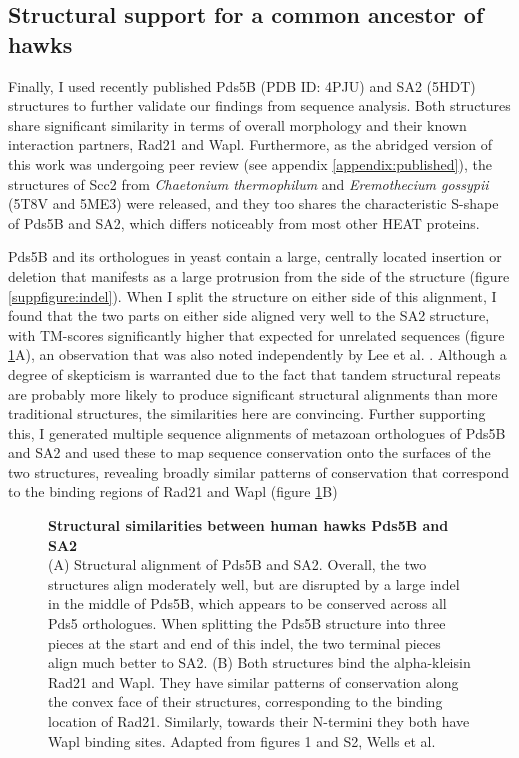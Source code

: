 \documentclass[a4paper,11pt,twoside,openright]{scrbook}
\begin{document}
\subsection{Structural support for a common ancestor of hawks}
Finally, I used recently published Pds5B \cite{Ouyang2016} (PDB ID: 4PJU) and SA2 \cite{Hara2014} (5HDT) structures to further validate our findings from sequence analysis. Both structures share significant similarity in terms of overall morphology and their known interaction partners, Rad21 and Wapl. Furthermore, as the abridged version of this work was undergoing peer review \cite{Wells2017} (see appendix \ref{appendix:published}), the structures of Scc2 from \textit{Chaetonium thermophilum} \cite{Kikuchi2016} and \textit{Eremothecium gossypii} \cite{Chao2017} (5T8V and 5ME3) were released, and they too shares the characteristic S-shape of Pds5B and SA2, which differs noticeably from most other HEAT proteins.

Pds5B and its orthologues in yeast contain a large, centrally located insertion or deletion that manifests as a large protrusion from the side of the structure (figure \ref{suppfigure:indel}). When I split the structure on either side of this alignment, I found that the two parts on either side aligned very well to the SA2 structure, with TM-scores significantly higher that expected for unrelated sequences (figure \ref{figure:smcstruc}A), an observation that was also noted independently by Lee et al. \cite{Lee2016}. Although a degree of skepticism is warranted due to the fact that tandem structural repeats are probably more likely to produce significant structural alignments than more traditional structures, the similarities here are convincing. Further supporting this, I generated multiple sequence alignments of metazoan orthologues of Pds5B and SA2 and used these to map sequence conservation onto the surfaces of the two structures, revealing broadly similar patterns of conservation that correspond to the binding regions of Rad21 and Wapl (figure \ref{figure:smcstruc}B)

\begin{figure}[h]
    \caption[Structural similarities between human hawks Pds5B and SA2]{\sffamily \textbf{Structural similarities between human hawks Pds5B and SA2} \\ \small (A) Structural alignment of Pds5B and SA2. Overall, the two structures align moderately well, but are disrupted by a large indel in the middle of Pds5B, which appears to be conserved across all Pds5 orthologues. When splitting the Pds5B structure into three pieces at the start and end of this indel, the two terminal pieces align much better to SA2. (B) Both structures bind the alpha-kleisin Rad21 and Wapl. They have similar patterns of conservation along the convex face of their structures, corresponding to the binding location of Rad21. Similarly, towards their N-termini they both have Wapl binding sites. Adapted from figures 1 and S2, Wells et al. \cite{Wells2017}}
    \label{figure:smcstruc}
\end{figure}
\end{document}
